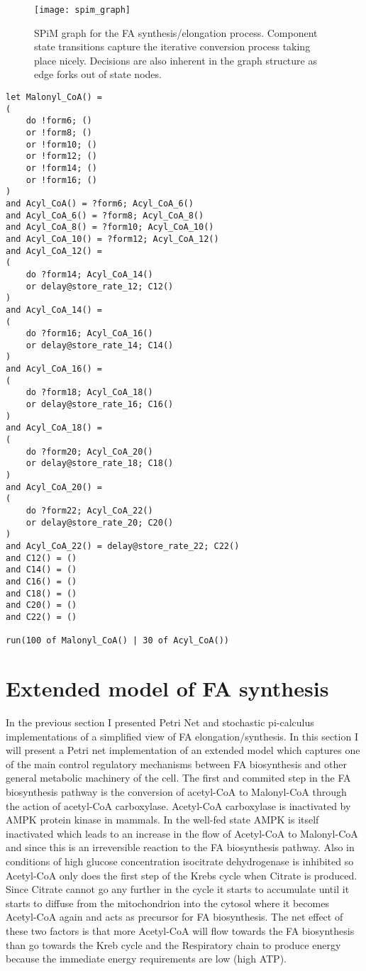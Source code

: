 \begin{figure}[htbp!]
\centering
\texttt{[image: spim\_graph]}
\caption[SPiM graph]{SPiM graph for the FA synthesis/elongation
  process. Component state transitions capture the iterative
  conversion process taking place nicely. Decisions are also inherent
  in the graph structure as edge forks out of state nodes.}
\label{fig:spim_graph}
\end{figure}

\begin{verbatim}
let Malonyl_CoA() =
(
	do !form6; ()
	or !form8; ()
	or !form10; ()
	or !form12; ()
	or !form14; ()
	or !form16; ()
)
and Acyl_CoA() = ?form6; Acyl_CoA_6()
and Acyl_CoA_6() = ?form8; Acyl_CoA_8()
and Acyl_CoA_8() = ?form10; Acyl_CoA_10()
and Acyl_CoA_10() = ?form12; Acyl_CoA_12()
and Acyl_CoA_12() =
(
	do ?form14; Acyl_CoA_14()
	or delay@store_rate_12; C12()
)
and Acyl_CoA_14() =
(
	do ?form16; Acyl_CoA_16()
	or delay@store_rate_14; C14()
)
and Acyl_CoA_16() =
(
	do ?form18; Acyl_CoA_18()
	or delay@store_rate_16; C16()
)
and Acyl_CoA_18() =
(
	do ?form20; Acyl_CoA_20()
	or delay@store_rate_18; C18()
)
and Acyl_CoA_20() =
(
	do ?form22; Acyl_CoA_22()
	or delay@store_rate_20; C20()
)
and Acyl_CoA_22() = delay@store_rate_22; C22()
and C12() = ()
and C14() = ()
and C16() = ()
and C18() = ()
and C20() = ()
and C22() = ()

run(100 of Malonyl_CoA() | 30 of Acyl_CoA())
\end{verbatim}


\section{Extended model of FA synthesis}
\label{sec:pn_ext_implementation}
In the previous section I presented Petri Net and stochastic
pi-calculus implementations of a
simplified view of FA elongation/synthesis. In this section I
will present a Petri net implementation of an extended model which
captures one of the main control regulatory mechanisms between FA
biosynthesis and other general metabolic
machinery of the cell. The first and commited step in the FA
biosynthesis pathway is the conversion of acetyl-CoA to Malonyl-CoA
through the action of acetyl-CoA carboxylase. Acetyl-CoA carboxylase
is inactivated by AMPK protein kinase in mammals. In the well-fed
state AMPK is itself inactivated which leads to an increase in the
flow of Acetyl-CoA to Malonyl-CoA and since this is an irreversible
reaction to the FA biosynthesis pathway.
Also in conditions of high glucose
concentration isocitrate dehydrogenase is inhibited so Acetyl-CoA only
does the first step of the Krebs cycle when Citrate is produced. Since
Citrate cannot go any further in the cycle it starts to accumulate
until it starts to diffuse from the mitochondrion into the cytosol
where it becomes Acetyl-CoA again and acts as precursor for FA
biosynthesis. The net effect of these two factors is that more Acetyl-CoA will
flow towards the FA biosynthesis than go towards the
Kreb cycle and the Respiratory chain to produce energy because the
immediate energy requirements are low (high ATP).

